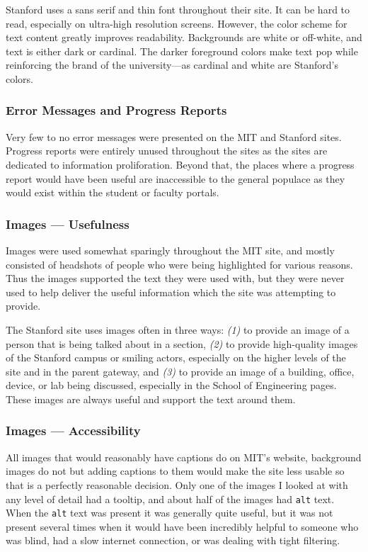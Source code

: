 
Stanford uses a sans serif and thin font throughout their site. It can be hard to read,
especially on ultra-high resolution screens. However, the color scheme for text
content greatly improves readability. Backgrounds are white or off-white, and text
is either dark or cardinal. The darker foreground colors make text pop while
reinforcing the brand of the university---as cardinal and white are Stanford's colors.

\subsubsection*{Error Messages and Progress Reports}

Very few to no error messages were presented on the MIT and Stanford sites.
Progress reports were entirely unused throughout the sites as the sites are dedicated to
information proliforation. Beyond that, the places where a progress report would have been
useful are inaccessible to the general populace as they would exist within the student or
faculty portals.

\subsubsection*{Images --- Usefulness}

Images were used somewhat sparingly throughout the MIT site, and mostly consisted of headshots of people who were
being highlighted for various reasons. Thus the images supported the text they were used
with, but they were never used to help deliver the useful information which the site
was attempting to provide.

The Stanford site uses images often in three ways: \textit{(1)} to provide an image
of a person that is being talked about in a section, \textit{(2)} to provide high-quality
images of the Stanford campus or smiling actors, especially on the higher levels of
the site and in the parent gateway, and \textit{(3)} to provide an image of a building,
office, device, or lab being discussed, especially in the School of Engineering
pages. These images are always useful and support the text around them.

\subsubsection*{Images --- Accessibility}

All images that would reasonably have captions do on MIT's website, background images do not but
adding captions to them would make the site less usable so that is a perfectly reasonable
decision. Only one of the images I looked at with any level of detail had a tooltip, and
about half of the images had \texttt{alt} text. When the \texttt{alt} text was present it was generally quite
useful, but it was not present several times when it would have been incredibly helpful to
someone who was blind, had a slow internet connection, or was dealing with tight filtering.

